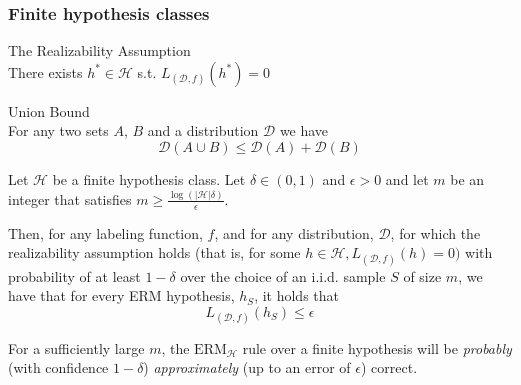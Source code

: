 \subsubsection{Finite hypothesis classes}

\begin{definition}{The Realizability Assumption} \\
    There exists $h^* \in \mathcal{H}$ s.t. $L_{(\mathcal{D}, f)}(h^*) = 0$
\end{definition}

\begin{lemma}{Union Bound} \\
    For any two sets $A$, $B$ and a distribution $\mathcal{D}$ we have
        $$\mathcal{D}(A \cup B) \leq \mathcal{D}(A) + \mathcal{D}(B)$$
\end{lemma}

\begin{corollary}

    Let $\mathcal{H}$ be a finite hypothesis class. Let $\delta \in (0, 1)$ and $\epsilon > 0$ and let $m$ be an integer that satisfies $m \geq \frac{\log(|\mathcal{H}| \delta)}{\epsilon}$.

Then, for any labeling function, $f$, and for any distribution, $\mathcal{D}$, for which the realizability assumption holds (that is, for some $h \in \mathcal{H}, L_{(\mathcal{D}, f)}(h) = 0)$ with probability of at least $1-\delta$ over the choice of an i.i.d. sample $S$ of size $m$, we have that for every ERM hypothesis, $h_S$, it holds that 
    $$L_{(\mathcal{D}, f)}(h_S) \leq \epsilon$$
\end{corollary}

For a sufficiently large $m$, the $\text{ERM}_\mathcal{H}$ rule over a finite hypothesis will be \textit{probably} (with confidence $1-\delta$) \textit{approximately} (up to an error of $\epsilon$) correct.


